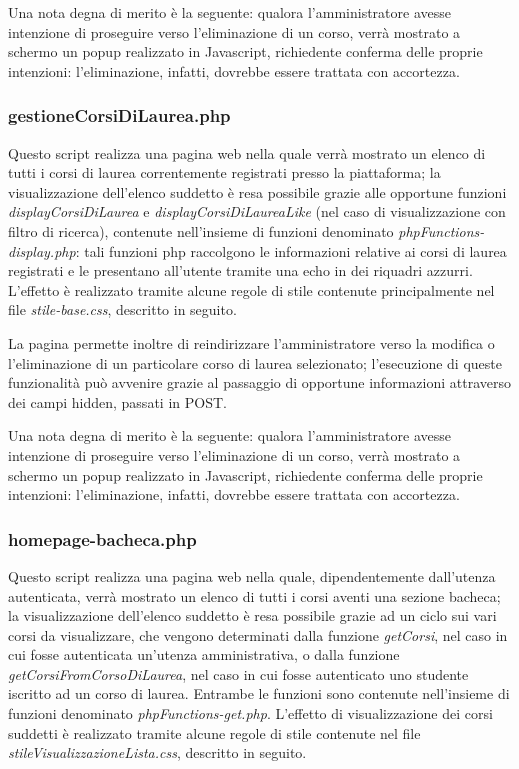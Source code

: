 \documentclass [a4paper,11pt]{book}
\begin{document}
Una nota degna di merito è la seguente: qualora l'amministratore avesse intenzione di proseguire verso l'eliminazione di un corso, verrà mostrato a schermo un popup realizzato in Javascript, richiedente conferma delle proprie intenzioni: l'eliminazione, infatti, dovrebbe essere trattata con accortezza.

\medskip

\subsubsection{gestioneCorsiDiLaurea.php}

Questo script realizza una pagina web nella quale verrà mostrato un elenco di tutti i corsi di laurea correntemente registrati presso la piattaforma; la visualizzazione dell'elenco suddetto è resa possibile grazie alle opportune funzioni \emph{displayCorsiDiLaurea} e \emph{displayCorsiDiLaureaLike} (nel caso di visualizzazione con filtro di ricerca), contenute nell'insieme di funzioni denominato \emph{phpFunctions-display.php}: tali funzioni php raccolgono le informazioni relative ai corsi di laurea registrati e le presentano all'utente tramite una echo in dei riquadri azzurri. L'effetto è realizzato tramite alcune regole di stile contenute principalmente nel file \emph{stile-base.css}, descritto in seguito.

La pagina permette inoltre di reindirizzare l'amministratore verso la modifica o l'eliminazione di un particolare corso di laurea selezionato; l'esecuzione di queste funzionalità può avvenire grazie al passaggio di opportune informazioni attraverso dei campi hidden, passati in POST.

Una nota degna di merito è la seguente: qualora l'amministratore avesse intenzione di proseguire verso l'eliminazione di un corso, verrà mostrato a schermo un popup realizzato in Javascript, richiedente conferma delle proprie intenzioni: l'eliminazione, infatti, dovrebbe essere trattata con accortezza.

\medskip

\subsubsection{homepage-bacheca.php}

Questo script realizza una pagina web nella quale, dipendentemente dall'utenza autenticata, verrà mostrato un elenco di tutti i corsi aventi una sezione bacheca; la visualizzazione dell'elenco suddetto è resa possibile grazie ad un ciclo sui vari corsi da visualizzare, che vengono determinati dalla funzione \emph{getCorsi}, nel caso in cui fosse autenticata un'utenza amministrativa, o dalla funzione \emph{getCorsiFromCorsoDiLaurea}, nel caso in cui fosse autenticato uno studente iscritto ad un corso di laurea. Entrambe le funzioni sono contenute nell'insieme di funzioni denominato \emph{phpFunctions-get.php}. L'effetto di visualizzazione dei corsi suddetti è realizzato tramite alcune regole di stile contenute nel file \emph{stileVisualizzazioneLista.css}, descritto in seguito.
\end{document}
